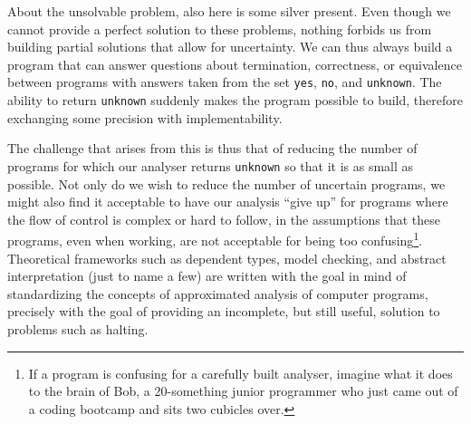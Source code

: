 About the unsolvable problem, also here is some silver present. Even though we cannot provide a perfect solution to these problems, nothing forbids us from building partial solutions that allow for uncertainty. We can thus always build a program that can answer questions about termination, correctness, or equivalence between programs with answers taken from the set \texttt{yes}, \texttt{no}, and \texttt{unknown}. The ability to return \texttt{unknown} suddenly makes the program possible to build, therefore exchanging some precision with implementability. 

The challenge that arises from this is thus that of reducing the number of programs for which our analyser returns \texttt{unknown} so that it is as small as possible. Not only do we wish to reduce the number of uncertain programs, we might also find it acceptable to have our analysis ``give up'' for programs where the flow of control is complex or hard to follow, in the assumptions that these programs, even when working, are not acceptable for being too confusing\footnote{If a program is confusing for a carefully built analyser, imagine what it does to the brain of Bob, a 20-something junior programmer who just came out of a coding bootcamp and sits two cubicles over.}. Theoretical frameworks such as dependent types, model checking, and abstract interpretation (just to name a few) are written with the goal in mind of standardizing the concepts of approximated analysis of computer programs, precisely with the goal of providing an incomplete, but still useful, solution to problems such as halting.
